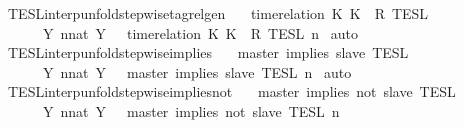 \begin{isabellebody}
\ TESL{\isacharunderscore}interp{\isacharunderscore}unfold{\isacharunderscore}stepwise{\isacharunderscore}tagrelgen{\isacharcolon}\isanewline
\ \ {\isacartoucheopen}{\isasymlbrakk}\ time{\isacharminus}relation\ {\isasymlfloor}K\ K\ {\isasymin}\ R\ {\isasymrbrakk}\isactrlsub T\isactrlsub E\isactrlsub S\isactrlsub L\isanewline
\ \ \ \ {\isacharequal}\ {\isasymInter}\ {\isacharbraceleft}Y{\isachardot}\ {\isasymexists}n{\isacharcolon}{\isacharcolon}nat{\isachardot}\ Y\ {\isacharequal}\ {\isasymlbrakk}\ time{\isacharminus}relation\ {\isasymlfloor}K\ K\ {\isasymin}\ R\ {\isasymrbrakk}\isactrlsub T\isactrlsub E\isactrlsub S\isactrlsub L\isactrlbsup {\isasymge}\ n\isactrlesup {\isacharbraceright}{\isacartoucheclose}\isanewline
%
\isadelimproof
%
\endisadelimproof
%
\isatagproof
{}\isamarkupfalse%
\ auto%
\endisatagproof
{\isafoldproof}%
%
\isadelimproof
\isanewline
%
\endisadelimproof
\isanewline
{}\isamarkupfalse%
\ TESL{\isacharunderscore}interp{\isacharunderscore}unfold{\isacharunderscore}stepwise{\isacharunderscore}implies{\isacharcolon}\isanewline
\ \ {\isacartoucheopen}{\isasymlbrakk}\ master\ implies\ slave\ {\isasymrbrakk}\isactrlsub T\isactrlsub E\isactrlsub S\isactrlsub L\isanewline
\ \ \ \ {\isacharequal}\ {\isasymInter}\ {\isacharbraceleft}Y{\isachardot}\ {\isasymexists}n{\isacharcolon}{\isacharcolon}nat{\isachardot}\ Y\ {\isacharequal}\ {\isasymlbrakk}\ master\ implies\ slave\ {\isasymrbrakk}\isactrlsub T\isactrlsub E\isactrlsub S\isactrlsub L\isactrlbsup {\isasymge}\ n\isactrlesup {\isacharbraceright}{\isacartoucheclose}\isanewline
%
\isadelimproof
%
\endisadelimproof
%
\isatagproof
{}\isamarkupfalse%
\ auto%
\endisatagproof
{\isafoldproof}%
%
\isadelimproof
\isanewline
%
\endisadelimproof
\isanewline
{}\isamarkupfalse%
\ TESL{\isacharunderscore}interp{\isacharunderscore}unfold{\isacharunderscore}stepwise{\isacharunderscore}implies{\isacharunderscore}not{\isacharcolon}\isanewline
\ \ {\isacartoucheopen}{\isasymlbrakk}\ master\ implies\ not\ slave\ {\isasymrbrakk}\isactrlsub T\isactrlsub E\isactrlsub S\isactrlsub L\isanewline
\ \ \ \ {\isacharequal}\ {\isasymInter}\ {\isacharbraceleft}Y{\isachardot}\ {\isasymexists}n{\isacharcolon}{\isacharcolon}nat{\isachardot}\ Y\ {\isacharequal}\ {\isasymlbrakk}\ master\ implies\ not\ slave\ {\isasymrbrakk}\isactrlsub T\isactrlsub E\isactrlsub S\isactrlsub L\isactrlbsup {\isasymge}\ n\isactrlesup {\isacharbraceright}{\isacartoucheclose}\isanewline

\end{isabellebody}
